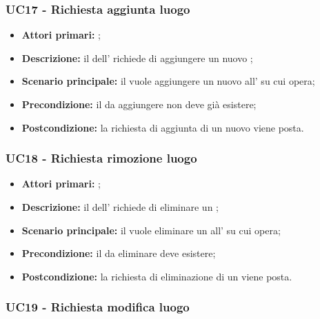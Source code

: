 \documentclass[casi-duso]{subfiles}
\begin{document}
\subsubsection{UC17 - Richiesta aggiunta luogo}
\label{subsub:UC17}

\begin{itemize}
  \item \textbf{Attori primari:} ;
  \item \textbf{Descrizione:} il  dell' richiede di aggiungere un nuovo ;
  \item \textbf{Scenario principale:} il  vuole aggiungere un nuovo  all' su cui opera;
  \item \textbf{Precondizione:} il  da aggiungere non deve già esistere;
  \item \textbf{Postcondizione:} la richiesta di aggiunta di un nuovo  viene posta.

\end{itemize}

\subsubsection{UC18 - Richiesta rimozione luogo}
\label{subsub:UC18}

\begin{itemize}
  \item \textbf{Attori primari:} ;
  \item \textbf{Descrizione:} il  dell' richiede di eliminare un ;
  \item \textbf{Scenario principale:} il  vuole eliminare un  all' su cui opera;
  \item \textbf{Precondizione:} il  da eliminare deve esistere;
  \item \textbf{Postcondizione:} la richiesta di eliminazione di un  viene posta.

\end{itemize}

\subsubsection{UC19 - Richiesta modifica luogo}
\label{subsub:UC19}
\end{document}
